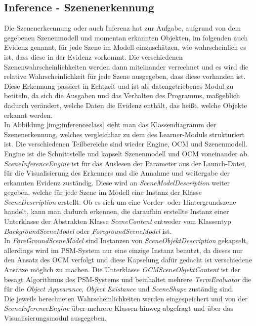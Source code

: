 \subsection{Inference - Szenenerkennung}\label{sub:inference}
Die Szenenerkeennung oder auch Inferenz hat zur Aufgabe, aufgrund von dem gegebenen Szenenmodell und momentan erkannten Objekten, im folgenden auch Evidenz genannt, für jede Szene im Modell einzuschätzen, wie wahrscheinlich es ist, dass diese in der Evidenz vorkommt. Die verschiedenen Szenenwahrscheinlichkeiten werden dann miteinander verrechnet und es wird die relative Wahrscheinlichkeit für jede Szene ausgegeben, dass diese vorhanden ist. Diese Erkennung passiert in Echtzeit und ist als datengetriebenes Modul zu betiteln, da sich die Ausgaben und das Verhalten des Programms, maßgeblich dadurch verändert, welche Daten die Evidenz enthält, das heißt, welche Objekte erkannt werden.\smallskip\\
In Abbildung \ref{img:inferenceclass} sieht man das Klassendiagramm der Szenenerkennung, welches vergleichbar zu dem des Learner-Moduls strukturiert ist. Die verschiedenen Teilbereiche sind wieder Engine, OCM und Szenenmodell. Engine ist die Schnittstelle und kapselt Szenenmodell und OCM voneinander ab. \textit{SceneInferenceEngine} ist für das Auslesen der Parameter aus der Launch-Datei, für die Visualisierung des Erkenners und die Annahme und weitergabe der erkannten Evidenz zuständig. Diese wird an \textit{SceneModelDescription} weiter gegeben, welche für jede Szene im Modell eine Instanz der Klasse \textit{SceneDescription} erstellt. Ob es sich um eine Vorder- oder Hintergrundszene handelt, kann man dadurch erkennen, die daraufhin erstellte Instanz einer Unterklasse der Abstrakten Klasse \textit{SceneContent} entweder vom Klassentyp \textit{BackgroundSceneModel} oder \textit{ForegroundSceneModel} ist. \smallskip\\
In \textit{ForeGroundSceneModel} sind Instanzen von \textit{SceneObjektDescription} gekapselt, allerdings wird im PSM-System nur eine einzige Instanz benutzt, da dieses nur den Ansatz des OCM verfolgt und diese Kapselung dafür gedacht ist verschiedene Ansätze möglich zu machen. Die Unterklasse \textit{OCMSceneObjektContent} ist der besagt Algorithmus des PSM-Systems und beinhaltet mehrere \textit{TermEvaluator} die für die \textit{Object Appearance}, \textit{Object Existance} und \textit{SceneShape} zuständig sind.\smallskip\\
Die jeweils berechneten Wahrscheinlichkeiten werden eingespeichert und von der \textit{SceneInferenceEngine} über mehrere Klassen hinweg abgefragt und über das Visualisierungsmodul ausgegeben.
